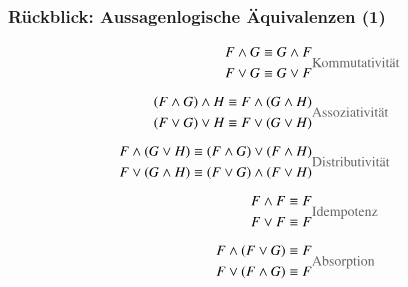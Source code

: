 \documentclass[aspectratio=1610,onlymath]{beamer}
\begin{document}
\begin{frame}\frametitle{Rückblick: Aussagenlogische Äquivalenzen (1)}

\begin{align*}
\begin{split}
F\wedge G & \equiv G\wedge F\\
F\vee G & \equiv G\vee F
\end{split}
		& \text{\textcolor{devilscss}{Kommutativität}} \\[1ex]
%
\begin{split}
(F\wedge G)\wedge H & \equiv F\wedge (G\wedge H)\\
(F\vee G)\vee H & \equiv F\vee (G\vee H)
\end{split}
		& \text{\textcolor{devilscss}{Assoziativität}} \\[1ex]
%
\begin{split}
F\wedge (G\vee H) & \equiv (F\wedge G) \vee (F\wedge H)\\
F\vee (G\wedge H) & \equiv (F\vee G)\wedge (F\vee H)
\end{split}
		& \text{\textcolor{devilscss}{Distributivität}} \\[1ex]
%
\begin{split}
F\wedge F & \equiv F\\
F\vee F & \equiv F
\end{split}
		& \text{\textcolor{devilscss}{Idempotenz}} \\[1ex]
%
\begin{split}
F\wedge (F\vee G) & \equiv F\\
F\vee (F\wedge G) & \equiv F
\end{split}
		& \text{\textcolor{devilscss}{Absorption}}
\end{align*}

\end{frame}
\end{document}
